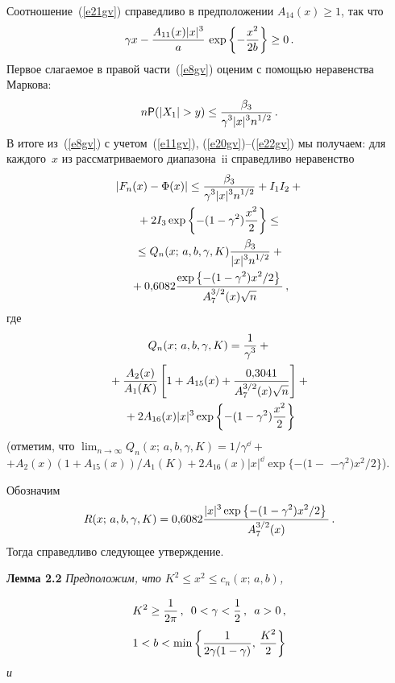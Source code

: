 \begin{multicols}{2}
Соотношение~(\ref{e21gv}) справедливо в предположении
$A_{14}(x)\ge 1$, так что
$$
\gamma
x-\fr{A_{11}(x)|x|^{\dd}}{a}\,\exp\left\{-\fr{x^2}{2b}\right\}\ge 0\,.
$$
Первое слагаемое в правой части~(\ref{e8gv}) оценим с помощью неравенства
Маркова:
\begin{equation}
n{\sf P}(|X_1|>y)\le\fr{\betr}{\gamma^{\dd}
|x|^{\dd}n^{\d/2}}\,.\label{e22gv}
\end{equation}
В итоге из~(\ref{e8gv}) с учетом~(\ref{e11gv}), (\ref{e20gv})--(\ref{e22gv}) мы
получаем: для каждого~$x$ из рассматриваемого диапазона~ii
справедливо неравенство
\begin{multline}
\left|F_n(x)-\Phi(x)\right|\le\fr{\betr}{\gamma^{\dd}|x|^{\dd}n^{\d/2}}+I_1
I_2+{}\\
{}+2I_3\exp\left\{-(1-\gamma^2)\fr{x^2}{2}\right\}\le{}\\
{}\le 
Q_n(x;\,a,b,\gamma,K)\fr{\betr}{|x|^{\dd}n^{\d/2}}+{}\\
{}+
0{,}6082\fr{\exp\left\{-(1-\gamma^2)x^2/2\right\}}{A_7^{3/2}(x)\sqrt{n}}\,,\label{e23gv}
\end{multline}
где
\begin{multline*}
Q_n(x;\,a,b,\gamma,K)=\fr{1}{\gamma^{\dd}}+{}\\
{}+
\fr{A_2(x)}{A_1(K)}\left[1+A_{15}(x)+
\fr{0{,}3041}{A_7^{3/2}(x)\sqrt{n}}\right]+{}\\
{}+2A_{16}(x)|x|^{\dd}\exp\left\{-(1-\gamma^2)\fr{x^2}{2}\right\}
\end{multline*}
(отметим, что
$ %
\lim_{n\to\infty}Q_n(x;\,a,b,\gamma,K)={1}/{\gamma^{\dd}}+$\linebreak $+
{A_2(x)\left(1+A_{15}(x)\right)}/{A_1(K)}+2A_{16}(x)|x|^{\dd}\exp\{-(1-$\linebreak 
$-\gamma^2){x^2}/{2}\}$).

Обозначим
$$
R(x;\,a,b,\gamma,K)=0{,}6082\fr{|x|^{\dd}\exp\left\{-(1-\gamma^2){x^2}/{2}\right\}}{A_7^{3/2}(x)}\,.
$$
Тогда справедливо следующее утверждение.

\columnbreak

\noindent
\textbf{Лемма 2.2} \textit{Предположим, что $K^2\le x^2\le
c_n(x;\,a,b)$,}

\noindent
\begin{multline*}
K^2\ge\fr{1}{2\pi}\,,\enskip  0<\gamma<\fr{1}{2}\,,\enskip  a>0\,,\\
1<b<\min\left\{\fr{1}{2\gamma(1-\gamma)},\,\fr{K^2}{2}\right\}
\end{multline*}
\textit{и}


\end{multicols}
